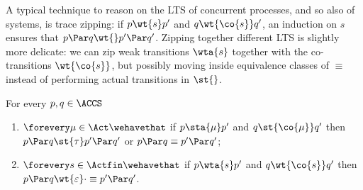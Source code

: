 


A typical technique to reason on the LTS of concurrent processes, and
so also of \svrclt systems, is trace zipping:
if $p \wt{s} p'$ and $q \wt{ \co{s }} q'$, an induction on $s$ ensures
that $p \Par q \wt{ } p' \Par q'$.
Zipping together different LTS is slightly more delicate: we can zip
weak transitions $ \wta{ s } $ together with the co-transitions $ \wt{
  \co{s} } $, but possibly moving inside equivalence classes of $\equiv$
instead of performing actual transitions in $\st{}$.


\begin{lemma}[Zipping]
  \label{lem:zipping}
  For every $p,q \in \ACCS$
  \begin{enumerate}
  \item %
    \label{pt:zipping-strong}%
    $\forevery \mu \in \Act \wehavethat$
    if $p \sta{ \mu } p'$ and $q \st{\co{ \mu }} q'$ then
    $p \Par q \st{\tau}  p' \Par q'$ or $p \Par q \equiv p' \Par q'$;

  \item %
    \label{pt:zipping-weak}%
    $\forevery s \in \Actfin \wehavethat$
    if $p \wta{s} p'$ and $q \wt{\co{s}} q'$ then
    $ p \Par q \wt{\varepsilon} \cdot \equiv p' \Par q'$.
  \end{enumerate}
\end{lemma}

